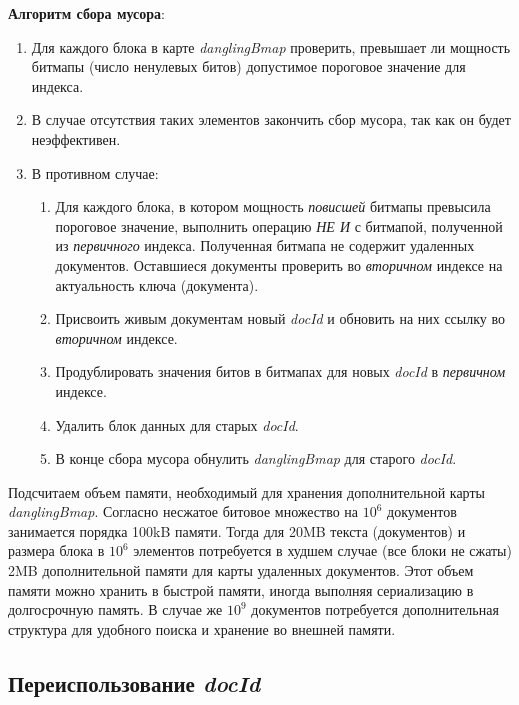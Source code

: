 \textbf{Алгоритм сбора мусора}:
\begin{enumerate}
    \item Для каждого блока в карте \textit{danglingBmap} проверить, превышает
    ли мощность битмапы (число ненулевых битов) допустимое пороговое значение
    для индекса.
    \item В случае отсутствия таких элементов закончить сбор мусора, так
    как он будет неэффективен.
    \item В противном случае: \begin{enumerate}
        \item Для каждого блока, в котором мощность \textit{повисшей} битмапы
        превысила пороговое значение, выполнить операцию \textit{НЕ И} с битмапой,
        полученной из \textit{первичного} индекса. Полученная битмапа не содержит
        удаленных документов. Оставшиеся документы проверить во \textit{вторичном}
        индексе на актуальность ключа (документа).
        \item Присвоить живым документам новый \textit{docId} и обновить
        на них ссылку во \textit{вторичном} индексе.
        \item Продублировать значения битов в битмапах для новых \textit{docId}
        в \textit{первичном} индексе.
        \item Удалить блок данных для старых \textit{docId}.
        \item В конце сбора мусора обнулить  \textit{danglingBmap} для старого
        \textit{docId}.
    \end{enumerate}
\end{enumerate}

Подсчитаем объем памяти, необходимый для хранения дополнительной карты
\textit{danglingBmap}. Согласно \cite{Roaring:2019} несжатое битовое множество
на $10^6$ документов занимается порядка 100kB памяти. Тогда для 20MB текста
(документов) и размера блока в $10^6$ элементов потребуется в худшем случае
(все блоки не сжаты) 2MB дополнительной памяти для карты удаленных документов.
Этот объем памяти можно хранить в быстрой памяти, иногда выполняя сериализацию
в долгосрочную память. В случае же $10^9$ документов потребуется дополнительная
структура для удобного поиска и хранение во внешней памяти.

\subsection{Переиспользование \textit{docId}}

